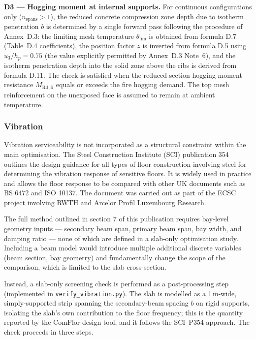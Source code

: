 \textbf{D3 --- Hogging moment at internal supports.} For continuous configurations only ($n_\mathrm{spans} > 1$), the reduced concrete compression zone depth due to isotherm penetration $b$ is determined by a single forward pass following the procedure of Annex~D.3: the limiting mesh temperature $\theta_\mathrm{lim}$ is obtained from formula D.7 (Table~D.4 coefficients), the position factor $z$ is inverted from formula D.5 using $u_3/h_p = 0.75$ (the value explicitly permitted by Annex~D.3 Note~6), and the isotherm penetration depth into the solid zone above the ribs is derived from formula D.11. The check is satisfied when the reduced-section hogging moment resistance $M_\mathrm{Rd,fi}$ equals or exceeds the fire hogging demand. The top mesh reinforcement on the unexposed face is assumed to remain at ambient temperature.

\subsubsection*{Vibration}
\label{sec:vibration_method}

Vibration serviceability is not incorporated as a structural constraint within the main optimisation. The Steel Construction Institute (SCI) publication 354 \citep{RefWorks:hicks2009p354} outlines the design guidance for all types of floor construction involving steel for determining the vibration response of sensitive floors. It is widely used in practice and allows the floor response to be compared with other UK documents such as BS 6472 and ISO 10137. The document was carried out as part of the ECSC project involving RWTH and Arcelor Profil Luxembourg Research.

The full method outlined in section 7 of this publication requires bay-level geometry inputs --- secondary beam span, primary beam span, bay width, and damping ratio --- none of which are defined in a slab-only optimisation study. Including a beam model would introduce multiple additional discrete variables (beam section, bay geometry) and fundamentally change the scope of the comparison, which is limited to the slab cross-section.
 
Instead, a slab-only screening check is performed as a post-processing step (implemented in \texttt{verify\_vibration.py}). The slab is modelled as a 1\,m-wide, simply-supported strip spanning the secondary-beam spacing $b$ on rigid supports, isolating the slab's own contribution to the floor frequency; this is the quantity reported by the ComFlor design tool, and it follows the SCI~P354 approach. The check proceeds in three steps.
 
